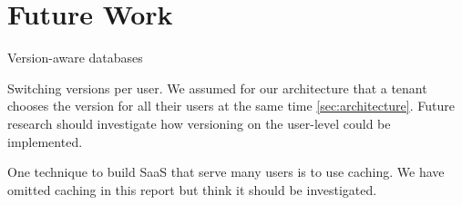 \section{Future Work}
\label{sec:futurework}

Version-aware databases

Switching versions per user. We assumed for our architecture that a tenant chooses the version for all their users at the same time \ref{sec:architecture}. Future research should investigate how versioning on the user-level could be implemented.

One technique to build SaaS that serve many users is to use caching. We have omitted caching in this report but think it should be investigated.